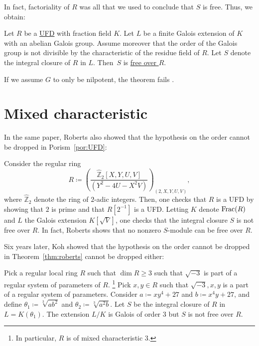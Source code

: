 \documentclass[12pt]{article}
\begin{document}
	In fact, factoriality of $R$ was all that we used to conclude that $S$ is free. Thus, we obtain:

	\begin{por} \label{por:UFD}
		Let $R$ be a \underline{UFD} with fraction field $K$. Let $L$ be a finite Galois extension of $K$ with an abelian Galois group. Assume moreover that the order of the Galois group is not divisible by the characteristic of the residue field of $R$. Let $S$ denote the integral closure of $R$ in $L$. Then~$S$ is \underline{free over $R$}.
	\end{por}

	If we assume $G$ to only be nilpotent, the theorem fails \cite[Example~2]{Roberts:Abelian}. 

\section{Mixed characteristic}
	
	In the same paper, Roberts \cite[Example~1]{Roberts:Abelian} also showed that the hypothesis on the order cannot be dropped in Porism~\ref{por:UFD}: 
	\begin{ex}
		Consider the regular ring
		\begin{equation*} 
			R \coloneqq 
			\left(
			\frac{\widehat{\mathbb{Z}}_{2}[X, Y, U, V]}%
			{(Y^{2} - 4U - X^{2} V)}\right)_{(2, X, Y, U, V)}
			,
		\end{equation*}	
		where $\widehat{\mathbb{Z}}_{2}$ denote the ring of $2$-adic integers. 
		Then, one checks that $R$ is a UFD by showing that $2$ is prime and that $R[2^{-1}]$ is a UFD. 
		Letting $K$ denote $\operatorname{Frac}(R)$ and $L$ the Galois extension $K[\sqrt{V}]$, one checks that the integral closure $S$ is not free over $R$. 
		In fact, Roberts shows that no nonzero $S$-module can be free over $R$. 
	\end{ex}

	Six years later, Koh \cite[Example~2.4]{Koh:unramified} showed that the hypothesis on the order cannot be dropped in Theorem~\ref{thm:roberts} cannot be dropped either: 
	\begin{ex}
		Pick a regular local ring $R$ such that $\dim R \ge 3$ such that $\sqrt{-3}$ is part of a regular system of parameters of $R$.%
		\footnote{In particular, $R$ is of mixed characteristic $3$.}
		Pick $x, y \in R$ such that $\sqrt{-3}, x, y$ is a part of a regular system of parameters. 
		Consider $a \coloneqq xy^4 + 27$ and $b \coloneqq x^4y + 27$, and define
		$\theta_1 \coloneqq \sqrt[3]{ab^2}$ and 
		$\theta_2 \coloneqq \sqrt[3]{a^2b}$.
		Let $S$ be the integral closure of $R$ in $L = K(\theta_1)$. 
		The extension $L/K$ is Galois of order $3$ but $S$ is not free over $R$. 
	\end{ex}
\end{document}
